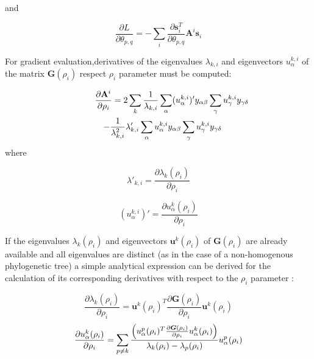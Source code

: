 \documentclass[reprint,amsmath,amssymb,superscriptaddress,showpacs,pre]{revtex4-1}
\let\originalleft\left
\let\originalright\right
\renewcommand{\left}{\mathopen{}\mathclose\bgroup\originalleft}
\renewcommand{\right}{\aftergroup\egroup\originalright}
\begin{document}
and

\begin{equation}
\frac{\partial L}{\partial \theta_{p,q} }=-\sum_{i} \frac{\partial \mathbf{s}_i^{T} }{\partial \theta_{p,q} } \mathbf{A}^{i}  \mathbf{s}_i
\end{equation}


For  gradient evaluation,derivatives of the eigenvalues $\lambda_ {k, i} $ and eigenvectors $u^{k, i}_{\alpha} $ of the matrix $\bm G(\rho_i) $ respect $\rho_i$ parameter must be computed:

\begin{eqnarray}
\nonumber
\lefteqn{\frac{\partial \mathbf{A}^{i} }{\partial\rho_i}=2 \sum_{k} \frac{1}{\lambda_{k,i}}\sum_{\alpha} (u_{\alpha}^{k,i})' y_{\alpha\beta}\sum_{\gamma} u^{k,i}_{\gamma} y_{\gamma\delta}}\\&&-\frac{1}{\lambda_{k,i}^2} \lambda'_{k,i}\sum_{\alpha}u^{k,i}_{\alpha}y_{\alpha\beta}\sum_{\gamma} u^{k,i}_{\gamma} y_{\gamma\delta}
\end{eqnarray}
where 


\begin{equation}\lambda'_{k,i}=\frac{\partial \lambda_k(\rho_i) }{\partial\rho_i}\end{equation}

\begin{equation}(u_{\alpha}^{k,i}) ' =\frac{\partial u^{k}_{\alpha}(\rho_i) }{\partial\rho_i}\end{equation}


If the eigenvalues $\lambda_k(\rho_i)$ and eigenvectors $\bm{u}^{k}(\rho_i)$ of  $\bm G(\rho_i)$ are  already available and all eigenvalues are distinct (as in the case of a non-homogenous phylogenetic tree) a simple analytical expression can be derived for the calculation of its corresponding derivatives with respect to the $\rho_i$ parameter \cite{matrix_cook_book} :

\begin{equation}
\frac{\partial \lambda_k(\rho_i) }{\partial\rho_i}=\bm{u}^{k}(\rho_i) ^T\frac{\partial \bm G(\rho_i) }{\partial\rho_i} \bm {u}^{k}(\rho_i) 
\end{equation}
\begin{eqnarray}
\nonumber
\frac{\partial u^{k}_{\alpha}(\rho_i)}{\partial\rho_i}=\sum_{p\neq k}\frac{\left( u^{p}_{\alpha}(\rho_i)^T\frac{\partial \bm G(\rho_i) }{\partial\rho_i} u^{k}_{\alpha}(\rho_i)\right) }{\lambda_{k}(\rho_i)-\lambda_{p}(\rho_i)} u^{p}_{\alpha}(\rho_i)
\end{eqnarray}
\end{document}
